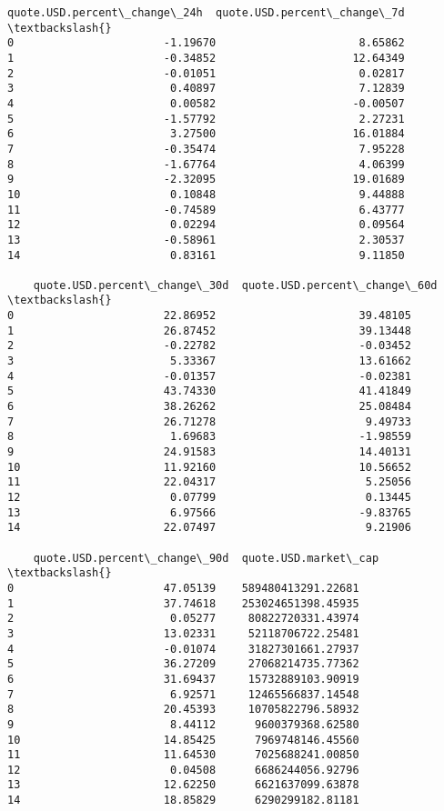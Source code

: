 \documentclass[11pt]{article}
\begin{document}
\begin{tcolorbox}[breakable, size=fbox, boxrule=.5pt, pad at break*=1mm, opacityfill=0]
\begin{Verbatim}[commandchars=\\\{\}]
    quote.USD.percent\_change\_24h  quote.USD.percent\_change\_7d  \textbackslash{}
0                       -1.19670                      8.65862
1                       -0.34852                     12.64349
2                       -0.01051                      0.02817
3                        0.40897                      7.12839
4                        0.00582                     -0.00507
5                       -1.57792                      2.27231
6                        3.27500                     16.01884
7                       -0.35474                      7.95228
8                       -1.67764                      4.06399
9                       -2.32095                     19.01689
10                       0.10848                      9.44888
11                      -0.74589                      6.43777
12                       0.02294                      0.09564
13                      -0.58961                      2.30537
14                       0.83161                      9.11850

    quote.USD.percent\_change\_30d  quote.USD.percent\_change\_60d  \textbackslash{}
0                       22.86952                      39.48105
1                       26.87452                      39.13448
2                       -0.22782                      -0.03452
3                        5.33367                      13.61662
4                       -0.01357                      -0.02381
5                       43.74330                      41.41849
6                       38.26262                      25.08484
7                       26.71278                       9.49733
8                        1.69683                      -1.98559
9                       24.91583                      14.40131
10                      11.92160                      10.56652
11                      22.04317                       5.25056
12                       0.07799                       0.13445
13                       6.97566                      -9.83765
14                      22.07497                       9.21906

    quote.USD.percent\_change\_90d  quote.USD.market\_cap  \textbackslash{}
0                       47.05139    589480413291.22681
1                       37.74618    253024651398.45935
2                        0.05277     80822720331.43974
3                       13.02331     52118706722.25481
4                       -0.01074     31827301661.27937
5                       36.27209     27068214735.77362
6                       31.69437     15732889103.90919
7                        6.92571     12465566837.14548
8                       20.45393     10705822796.58932
9                        8.44112      9600379368.62580
10                      14.85425      7969748146.45560
11                      11.64530      7025688241.00850
12                       0.04508      6686244056.92796
13                      12.62250      6621637099.63878
14                      18.85829      6290299182.81181


\end{Verbatim}
\end{tcolorbox}
\end{document}
